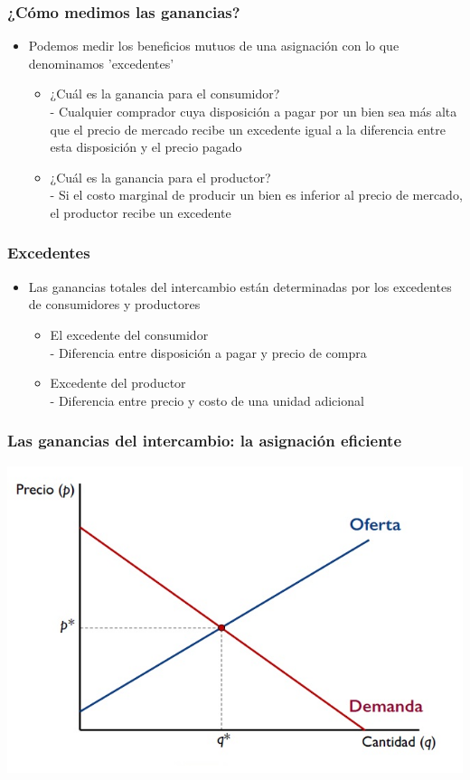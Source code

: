 \documentclass{beamer}
\begin{document}
\begin{frame}
\frametitle{¿Cómo medimos las ganancias?}
\begin{itemize}
    \item Podemos medir los beneficios mutuos de una asignación con lo que denominamos 'excedentes' 
    \begin{itemize}
        \item ¿Cuál es la ganancia para el consumidor? \\
        - Cualquier comprador cuya disposición a pagar por un bien sea más alta que el precio de mercado recibe un excedente igual a la diferencia entre esta disposición y el precio pagado
        \item ¿Cuál es la ganancia para el productor? \\
        - Si el costo marginal de producir un bien es inferior al precio de mercado, el productor recibe un excedente
    \end{itemize}
    \end{itemize}
\end{frame}

\begin{frame}
\frametitle{Excedentes}
\begin{itemize}
    \item Las ganancias totales del intercambio están determinadas por los excedentes de consumidores y productores
    \begin{itemize}
        \item El excedente del consumidor \\ - Diferencia entre disposición a pagar y precio de compra
        \item Excedente del productor \\ - Diferencia entre precio y costo de una unidad adicional
    \end{itemize}
    \end{itemize}
\end{frame}

\begin{frame}
\frametitle{Las ganancias del intercambio: la asignación eficiente}
\includegraphics[scale=0.55]{Slides Principios de Economia/Figures/Tema_07.3_equilibrioofertademanda_0.jpg}
\end{frame} 
\end{document}
